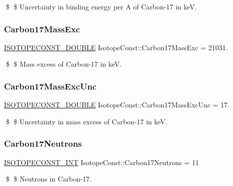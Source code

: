 \$ \$ Uncertainty in binding energy per A of Carbon-\/17 in keV. \mbox{\label{group___isotope_const-_carbon-_c17_ga2196ec465edccc36c9f5adff32600b4b}} 
\subsubsection{\texorpdfstring{Carbon17\+Mass\+Exc}{Carbon17MassExc}}
{\footnotesize\ttfamily \mbox{\hyperlink{group___isotope_const-_macros_ga8f45a7272ce02c0b4c65c44636ed719a}{I\+S\+O\+T\+O\+P\+E\+C\+O\+N\+S\+T\+\_\+\+D\+O\+U\+B\+LE}} Isotope\+Const\+::\+Carbon17\+Mass\+Exc = 21031.}

\$ \$ Mass excess of Carbon-\/17 in keV. \mbox{\label{group___isotope_const-_carbon-_c17_ga2ec3c6bbdc396d4e4c3f2c2c9def760d}} 
\subsubsection{\texorpdfstring{Carbon17\+Mass\+Exc\+Unc}{Carbon17MassExcUnc}}
{\footnotesize\ttfamily \mbox{\hyperlink{group___isotope_const-_macros_ga8f45a7272ce02c0b4c65c44636ed719a}{I\+S\+O\+T\+O\+P\+E\+C\+O\+N\+S\+T\+\_\+\+D\+O\+U\+B\+LE}} Isotope\+Const\+::\+Carbon17\+Mass\+Exc\+Unc = 17.}

\$ \$ Uncertainty in mass excess of Carbon-\/17 in keV. \mbox{\label{group___isotope_const-_carbon-_c17_ga97ed01a6378ef347cd993df8985aa3ee}} 
\subsubsection{\texorpdfstring{Carbon17\+Neutrons}{Carbon17Neutrons}}
{\footnotesize\ttfamily \mbox{\hyperlink{group___isotope_const-_macros_ga5f18360b3e99483a35c32d789e62621c}{I\+S\+O\+T\+O\+P\+E\+C\+O\+N\+S\+T\+\_\+\+I\+NT}} Isotope\+Const\+::\+Carbon17\+Neutrons = 11}

\$ \$ Neutrons in Carbon-\/17. \mbox{\label{group___isotope_const-_carbon-_c17_ga5a8fc99039780a05ad08799988c57a97}} 
